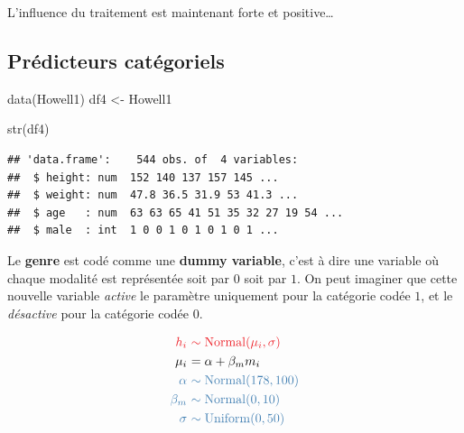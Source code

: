 \documentclass[
  a4paper,11pt,twoside,onecolumn,openright,final,oldfontcommands]{memoir}
\newenvironment{Shaded}{\begin{snugshade}}{\end{snugshade}}
\newcommand{\FunctionTok}[1]{\textcolor[rgb]{0.00,0.00,0.00}{#1}}
\newcommand{\NormalTok}[1]{#1}
\newcommand{\OtherTok}[1]{\textcolor[rgb]{0.56,0.35,0.01}{#1}}
\theoremstyle{definition}
\theoremstyle{definition}
\theoremstyle{definition}
\theoremstyle{definition}
\theoremstyle{remark}
\begin{document}
L'influence du traitement est maintenant forte et positive\ldots{}

\hypertarget{pruxe9dicteurs-catuxe9goriels}{%
\subsection{Prédicteurs catégoriels}\label{pruxe9dicteurs-catuxe9goriels}}

\begin{Shaded}
\begin{Highlighting}[]
\FunctionTok{data}\NormalTok{(Howell1)}
\NormalTok{df4 }\OtherTok{\textless{}{-}}\NormalTok{ Howell1}

\FunctionTok{str}\NormalTok{(df4)}
\end{Highlighting}
\end{Shaded}

\begin{verbatim}
## 'data.frame':    544 obs. of  4 variables:
##  $ height: num  152 140 137 157 145 ...
##  $ weight: num  47.8 36.5 31.9 53 41.3 ...
##  $ age   : num  63 63 65 41 51 35 32 27 19 54 ...
##  $ male  : int  1 0 0 1 0 1 0 1 0 1 ...
\end{verbatim}

Le \textbf{genre} est codé comme une \textbf{dummy variable}, c'est à dire une variable où chaque modalité est représentée soit par \(0\) soit par \(1\). On peut imaginer que cette nouvelle variable \emph{active} le paramètre uniquement pour la catégorie codée \(1\), et le \emph{désactive} pour la catégorie codée \(0\).

\[
\begin{aligned}
\color{orangered}{h_{i}} \ &\color{orangered}{\sim \mathrm{Normal}(\mu_{i}, \sigma)} \\
\color{black}{\mu_{i}} \ &\color{black}{= \alpha + \beta_{m}m_{i}} \\
\color{steelblue}{\alpha} \ &\color{steelblue}{\sim \mathrm{Normal}(178, 100)} \\
\color{steelblue}{\beta_{m}} \ &\color{steelblue}{\sim \mathrm{Normal}(0, 10)} \\
\color{steelblue}{\sigma} \ &\color{steelblue}{\sim \mathrm{Uniform}(0, 50)}
\end{aligned}
\]
\end{document}
